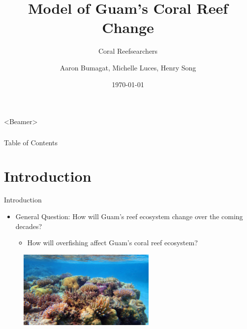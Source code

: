 \documentclass{beamer}
\title[]{Model of Guam's Coral Reef Change}
\subtitle{Coral Reefsearchers}
\author{Aaron Bumagat, Michelle Luces, Henry Song }
\institute{University of Guam}
\date{\today}
\begin{document}
\frame{\titlepage}

\AtBeginSection[]{}
\begin{frame}<Beamer>
\frametitle{}
\setcounter{tocdepth}{2}
\setcounter{tocdepth}{1}
\end{frame}

\begin{frame}{Table of Contents}
\tableofcontents
\end{frame}

\section{Introduction}
\begin{frame}{Introduction}
\begin{itemize}
    \item General Question: How will Guam's reef ecosystem change over the coming decades?
        \begin{itemize}
            \item How will overfishing affect Guam's coral reef ecosystem?
        \end{itemize}
\end{itemize}
\begin{figure}
    \centering
    \includegraphics[width=0.6\textwidth]{Figures/coral_picture.jpg}
\end{figure}
\end{frame}

\end{document}
